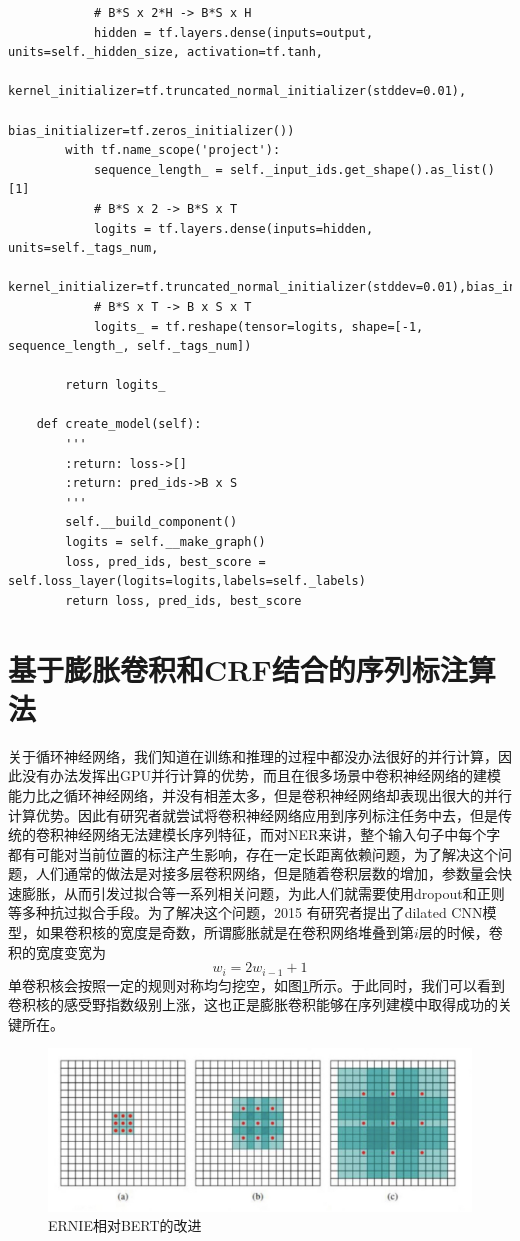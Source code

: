 \documentclass[twoside,a4paper,12pt]{book}%
\begin{document}
\begin{lstlisting}
			# B*S x 2*H -> B*S x H
			hidden = tf.layers.dense(inputs=output, units=self._hidden_size, activation=tf.tanh,
			                         kernel_initializer=tf.truncated_normal_initializer(stddev=0.01),
			                         bias_initializer=tf.zeros_initializer())
		with tf.name_scope('project'):
			sequence_length_ = self._input_ids.get_shape().as_list()[1]
			# B*S x 2 -> B*S x T
			logits = tf.layers.dense(inputs=hidden, units=self._tags_num,
			      kernel_initializer=tf.truncated_normal_initializer(stddev=0.01),bias_initializer=tf.zeros_initializer())
			# B*S x T -> B x S x T
			logits_ = tf.reshape(tensor=logits, shape=[-1, sequence_length_, self._tags_num])
		
		return logits_
	
	def create_model(self):
		'''
		:return: loss->[]
		:return: pred_ids->B x S
		'''
		self.__build_component()
		logits = self.__make_graph()
		loss, pred_ids, best_score = self.loss_layer(logits=logits,labels=self._labels)
		return loss, pred_ids, best_score
\end{lstlisting}

\section{基于膨胀卷积和CRF结合的序列标注算法}
关于循环神经网络，我们知道在训练和推理的过程中都没办法很好的并行计算，因此没有办法发挥出GPU并行计算的优势，而且在很多场景中卷积神经网络的建模能力比之循环神经网络，并没有相差太多，但是卷积神经网络却表现出很大的并行计算优势。因此有研究者就尝试将卷积神经网络应用到序列标注任务中去，但是传统的卷积神经网络无法建模长序列特征，而对\gls{NER}来讲，整个输入句子中每个字都有可能对当前位置的标注产生影响，存在一定长距离依赖问题，为了解决这个问题，人们通常的做法是对接多层卷积网络，但是随着卷积层数的增加，参数量会快速膨胀，从而引发过拟合等一系列相关问题，为此人们就需要使用dropout和正则等多种抗过拟合手段。为了解决这个问题，2015 有研究者提出了dilated \gls{CNN}模型，如果卷积核的宽度是奇数，所谓膨胀就是在卷积网络堆叠到第$i$层的时候，卷积的宽度变宽为
$$
w_i = 2 w_{i-1} + 1
$$单卷积核会按照一定的规则对称均匀挖空，如图\ref{fig:idcnn1}所示。于此同时，我们可以看到卷积核的感受野指数级别上涨，这也正是膨胀卷积能够在序列建模中取得成功的关键所在。
\begin{figure}[htbp]
\begin{center}
\includegraphics[width=5.8in]{figures/idcnn1.png}
\caption{ERNIE相对BERT的改进}
\label{fig:idcnn1}
\end{center}
\end{figure}
\end{document}
